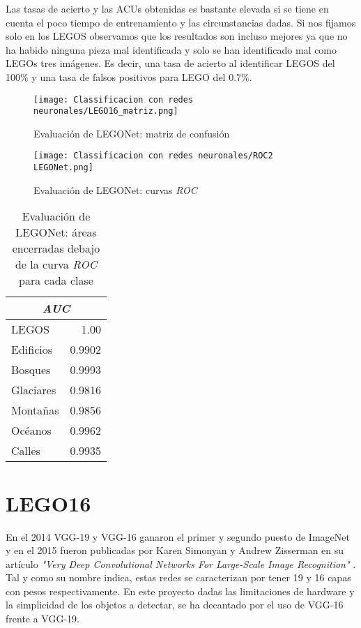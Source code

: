 Las tasas de acierto y las ACUs obtenidas es bastante elevada si se tiene en cuenta el poco tiempo de entrenamiento y las circunstancias dadas. Si nos fijamos solo en los LEGOS observamos que los resultados son incluso mejores ya que no ha habido ninguna pieza mal identificada y solo se han identificado mal como LEGOs tres imágenes. Es decir, una tasa de acierto al identificar LEGOS del 100\% y una tasa de falsos positivos para LEGO del 0.7\%.

\begin{figure}[ht]  %
	\centering
	\texttt{[image: Classificacion con redes neuronales/LEGO16\_matriz.png]}
	\caption{Evaluación de LEGONet: matriz de confusión}
	\label{fig:matriz LEGONet}
\end{figure}

\begin{figure}[ht]  %
	\centering
	\texttt{[image: Classificacion con redes neuronales/ROC2 LEGONet.png]}
	\caption{Evaluación de LEGONet: curvas \textit{ROC}}
	\label{fig:ROC LEGONet}
\end{figure}

\begin{table}[ht]
  \centering
    \begin{tabular}{|l|r|}
    \hline
    \multicolumn{2}{|c|}{\textit{AUC}}\\
    \hline
    LEGOS & 1.00 \\
    \hline
    Edificios & 0.9902 \\
    \hline
    Bosques & 0.9993 \\
    \hline
    Glaciares & 0.9816 \\
    \hline
    Montañas & 0.9856 \\
    \hline
    Océanos & 0.9962 \\
    \hline
    Calles & 0.9935 \\
    \hline
    \end{tabular}%
    \caption{Evaluación de LEGONet: áreas encerradas debajo de la curva \textit{ROC} para cada clase}
  \label{tab:ROC LEGONet}%
\end{table}%

\clearpage
\section{LEGO16}
En el 2014 VGG-19 y VGG-16 ganaron el primer y segundo puesto de ImageNet y en el 2015 fueron publicadas por Karen Simonyan y Andrew Zisserman en su artículo \textit{"Very Deep Convolutional Networks For Large-Scale Image Recognition"} \cite{VGG16}. Tal y como su nombre indica, estas redes se caracterizan por tener 19 y 16 capas con pesos respectivamente. En este proyecto dadas las limitaciones de hardware y la simplicidad de los objetos a detectar, se ha decantado por el uso de VGG-16 frente a VGG-19.

